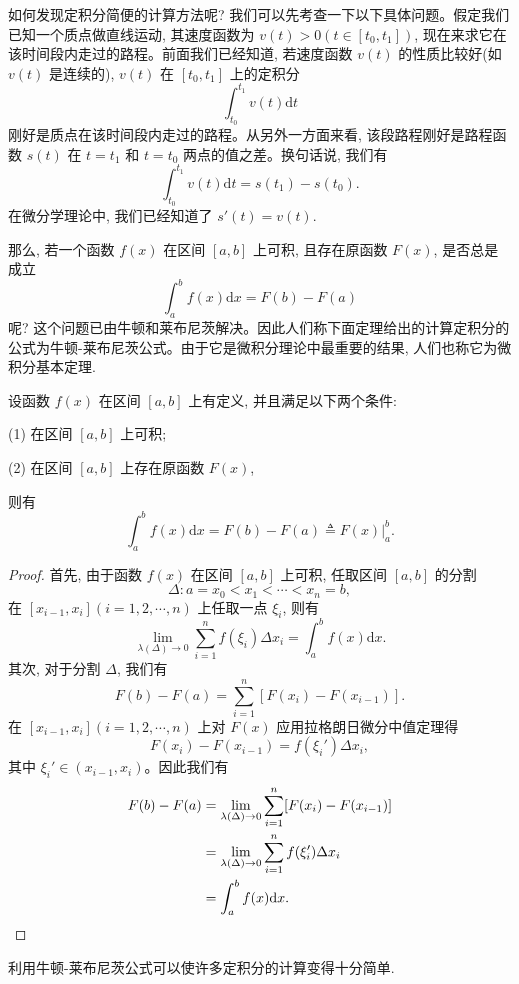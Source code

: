 如何发现定积分简便的计算方法呢? 我们可以先考查一下以下具体问题。假定我们已知一个质点做直线运动, 其速度函数为 $v(t)>0(t\in[t_0,t_1])$, 现在来求它在该时间段内走过的路程。前面我们已经知道, 若速度函数 $v(t)$ 的性质比较好(如 $v(t)$ 是连续的), $v(t)$ 在 $[t_0,t_1]$ 上的定积分
\[
  \int_{t_0}^{t_1}v(t)\mathrm dt
\]
刚好是质点在该时间段内走过的路程。从另外一方面来看, 该段路程刚好是路程函数 $s(t)$ 在 $t=t_1$ 和 $t=t_0$ 两点的值之差。换句话说, 我们有
\[
  \int_{t_0}^{t_1}v(t)\mathrm dt=s(t_1)-s(t_0).
\]
在微分学理论中, 我们已经知道了 $s'(t)=v(t)$.

那么, 若一个函数 $f(x)$ 在区间 $[a,b]$ 上可积, 且存在原函数 $F(x)$, 是否总是成立
\[
  \int_a^b f(x)\mathrm dx=F(b)-F(a)
\]
呢? 这个问题已由牛顿和莱布尼茨解决。因此人们称下面定理给出的计算定积分的公式为牛顿-莱布尼茨公式。由于它是微积分理论中最重要的结果, 人们也称它为微积分基本定理.

\begin{theorem}[{微积分基本定理}]\label{theorem:ma-7-1-2}
设函数 $f(x)$ 在区间 $[a,b]$ 上有定义, 并且满足以下两个条件:

(1) 在区间 $[a,b]$ 上可积;

(2) 在区间 $[a,b]$ 上存在原函数 $F(x)$,

则有
\begin{equation}
  \int_a^b f(x)\mathrm dx=F(b)-F(a)\triangleq F(x)\big|_a^b.
  \label{eq:ma-7-1-5}
\end{equation}
\end{theorem}


\begin{proof}
首先, 由于函数 $f(x)$ 在区间 $[a,b]$ 上可积, 任取区间 $[a,b]$ 的分割
\[
  \Delta:a=x_0<x_1<\cdots<x_n=b,
\]
在 $[x_{i-1},x_i](i=1,2,\cdots,n)$ 上任取一点 $\xi_i$, 则有
\[
  \lim_{\lambda(\Delta)\to0}\sum_{i=1}^n f(\xi_i)\Delta x_i=\int_a^b f(x)\mathrm dx.
\]
其次, 对于分割 $\Delta$, 我们有
\[
  F(b)-F(a)=\sum_{i=1}^n[F(x_i)-F(x_{i-1})].
\]
在 $[x_{i-1},x_i](i=1,2,\cdots,n)$ 上对 $F(x)$ 应用拉格朗日微分中值定理得
\[
  F(x_i)-F(x_{i-1})=f(\xi_i')\Delta x_i,
\]
其中 $\xi_i'\in(x_{i-1},x_i)$。因此我们有
\[
\begin{aligned}
  F(b)-F(a)
  &=\lim_{\lambda(\Delta)\to0}\sum_{i=1}^n[F(x_i)-F(x_{i-1})]\\
  &=\lim_{\lambda(\Delta)\to0}\sum_{i=1}^n f(\xi_i')\Delta x_i\\
  &=\int_a^b f(x)\mathrm dx.
\end{aligned}
\qedhere
\]
\end{proof}


利用牛顿-莱布尼茨公式可以使许多定积分的计算变得十分简单.

